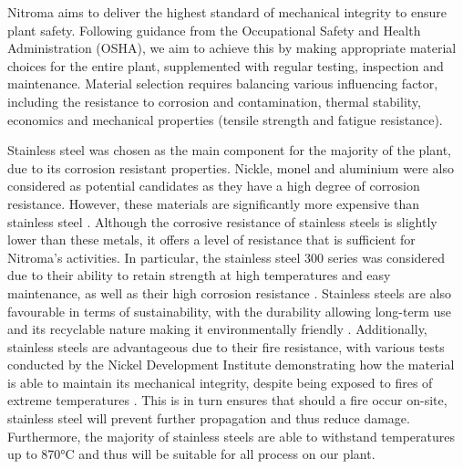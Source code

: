 Nitroma aims to deliver the highest standard of mechanical integrity to ensure plant safety.  Following guidance from the Occupational Safety and Health Administration (OSHA), we aim to achieve this by making appropriate material choices for the entire plant, supplemented with regular testing, inspection and maintenance. 
Material selection requires balancing various influencing factor, including the resistance to corrosion and contamination, thermal stability, economics and mechanical properties (tensile strength and fatigue resistance). 

Stainless steel was chosen as the main component for the majority of the plant, due to its corrosion resistant properties. Nickle, monel and aluminium were also considered as potential candidates as they have a high degree of corrosion resistance. However, these materials are significantly more expensive than stainless steel \cite{sinnott_coulson_2005}. Although the corrosive resistance of stainless steels is slightly lower than these metals, it offers a level of resistance that is sufficient for Nitroma's activities. In particular, the stainless steel 300 series was considered due to their ability to retain strength at high temperatures and easy maintenance, as well as their high corrosion resistance \cite{national_electronic_alloys_300_2021}. Stainless steels are also favourable in terms of sustainability, with the durability allowing long-term use and its recyclable nature making it environmentally friendly \cite{osterman_stainless_2013}. Additionally, stainless steels are advantageous due to their fire resistance, with various tests conducted by the Nickel Development Institute demonstrating how the material is able to maintain its mechanical integrity, despite being exposed to fires of extreme temperatures \cite{waller_stainless_1990}. This is in turn ensures that should a fire occur on-site, stainless steel will prevent further propagation and thus reduce damage.  Furthermore, the majority of stainless steels are able to withstand temperatures up to 870°C and thus will be suitable for all process on our plant. 



